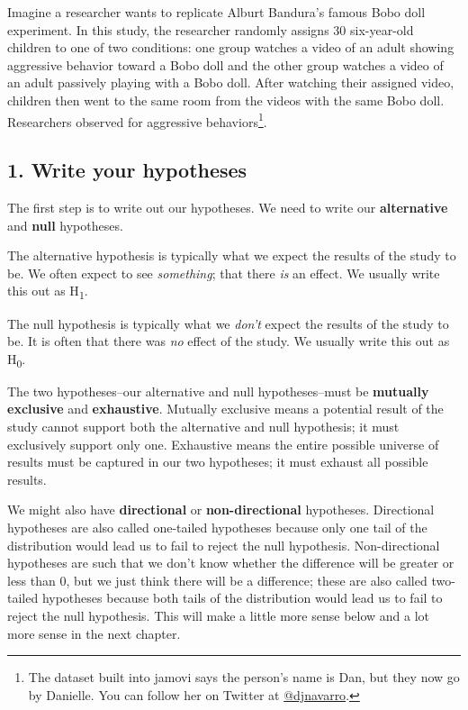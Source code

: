 \documentclass[
]{book}
\begin{document}
Imagine a researcher wants to replicate Alburt Bandura's famous Bobo doll experiment. In this study, the researcher randomly assigns 30 six-year-old children to one of two conditions: one group watches a video of an adult showing aggressive behavior toward a Bobo doll and the other group watches a video of an adult passively playing with a Bobo doll. After watching their assigned video, children then went to the same room from the videos with the same Bobo doll. Researchers observed for aggressive behaviors\footnote{The dataset built into jamovi says the person's name is Dan, but they now go by Danielle. You can follow her on Twitter at \href{https://twitter.com/djnavarro}{@djnavarro}.}.

\hypertarget{write-your-hypotheses}{%
\subsection{1. Write your hypotheses}\label{write-your-hypotheses}}

The first step is to write out our hypotheses. We need to write our \textbf{alternative} and \textbf{null} hypotheses.

The alternative hypothesis is typically what we expect the results of the study to be. We often expect to see \emph{something}; that there \emph{is} an effect. We usually write this out as H\textsubscript{1}.

The null hypothesis is typically what we \emph{don't} expect the results of the study to be. It is often that there was \emph{no} effect of the study. We usually write this out as H\textsubscript{0}.

The two hypotheses--our alternative and null hypotheses--must be \textbf{mutually exclusive} and \textbf{exhaustive}. Mutually exclusive means a potential result of the study cannot support both the alternative and null hypothesis; it must exclusively support only one. Exhaustive means the entire possible universe of results must be captured in our two hypotheses; it must exhaust all possible results.

We might also have \textbf{directional} or \textbf{non-directional} hypotheses. Directional hypotheses are also called one-tailed hypotheses because only one tail of the distribution would lead us to fail to reject the null hypothesis. Non-directional hypotheses are such that we don't know whether the difference will be greater or less than 0, but we just think there will be a difference; these are also called two-tailed hypotheses because both tails of the distribution would lead us to fail to reject the null hypothesis. This will make a little more sense below and a lot more sense in the next chapter.
\end{document}
